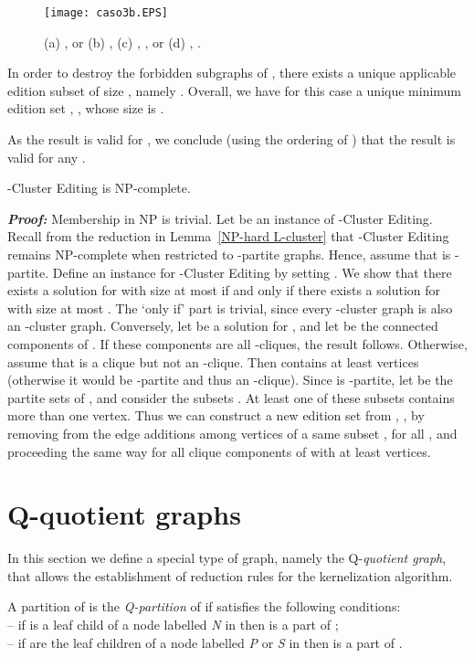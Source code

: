 \documentclass[12pt]{article}
\def\qed{ \fbox \par \medskip }
\def\qed2{ \hfill \framebox[.09in] \par \bigskip }
\begin{document}
\begin{figure}[htb]
\centering
\texttt{[image: caso3b.EPS]}
\caption{\label{caso3}(a) ,  or 
(b) , 
(c) , ,  or 
(d) , .}
\end{figure}

In order to destroy the forbidden subgraphs of , there exists a unique applicable edition subset of size , namely
. Overall, we have for this case a unique minimum edition set
, , whose size is .

As the result is valid for , we conclude (using the ordering  of ) that the result is valid for any . \qed2

\begin{teo}
{\sc -Cluster Editing} is NP-complete.
\end{teo}

\emph{\textbf{Proof:}} Membership in NP is trivial. Let  be an instance of {\sc -Cluster Editing}.
Recall from the reduction in Lemma~\ref{NP-hard L-cluster} that {\sc -Cluster Editing} remains NP-complete when restricted to -partite graphs.
Hence, assume that  is -partite. Define an instance  for {\sc -Cluster Editing} by setting . We show that there exists a solution for  with size at most  if and only if there exists a solution for  with size at most . The `only if' part is trivial, since every -cluster graph is also an -cluster graph.
Conversely, let  be a solution for , and let  be the connected components of .
If these components are all -cliques, the result follows. Otherwise, assume that  is a clique but not an -clique.
Then  contains at least  vertices (otherwise it would be -partite and thus an -clique). Since  is -partite, let  be the partite sets of ,
and consider the subsets .
At least one of these subsets contains more than one vertex. Thus we can construct a new edition set  from , ,
by removing from  the edge additions among vertices of a same subset , for all ,
and proceeding the same way for all clique components of  with at least  vertices. \qed2


\section{Q-quotient graphs}\label{sec3}

In this section we define a special type of graph, namely the Q-\emph{quotient graph}, that allows the establishment of reduction rules for the kernelization algorithm.


\begin{defin}
A partition  of  is the \emph{Q-partition} of  if  satisfies the following conditions:\\
-- if  is a leaf child of a node labelled \emph{N} in  then  is a part of ;\\
-- if  are the leaf children of a node labelled \emph{P} or \emph{S} in  then  is a part of .
\end{defin}
\end{document}

